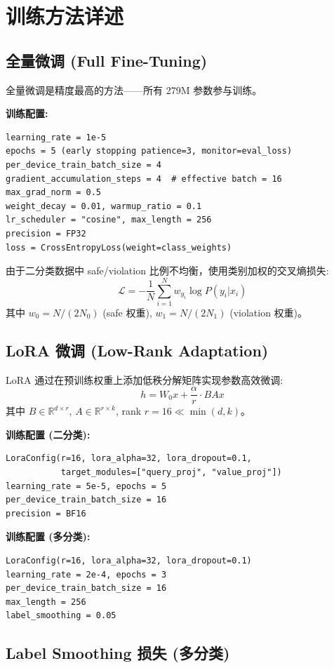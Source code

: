 \documentclass[11pt,a4paper]{article}
\begin{document}
\section{训练方法详述}

\subsection{全量微调 (Full Fine-Tuning)}

全量微调是精度最高的方法——所有 279M 参数参与训练。

\textbf{训练配置:}
\begin{verbatim}
learning_rate = 1e-5
epochs = 5 (early stopping patience=3, monitor=eval_loss)
per_device_train_batch_size = 4
gradient_accumulation_steps = 4  # effective batch = 16
max_grad_norm = 0.5
weight_decay = 0.01, warmup_ratio = 0.1
lr_scheduler = "cosine", max_length = 256
precision = FP32
loss = CrossEntropyLoss(weight=class_weights)
\end{verbatim}

由于二分类数据中 safe/violation 比例不均衡，使用类别加权的交叉熵损失:
\[ \mathcal{L} = -\frac{1}{N}\sum_{i=1}^N w_{y_i} \log P(y_i|x_i) \]
其中 $w_0 = N/(2N_0)$ (safe 权重), $w_1 = N/(2N_1)$ (violation 权重)。

\subsection{LoRA 微调 (Low-Rank Adaptation)}

LoRA 通过在预训练权重上添加低秩分解矩阵实现参数高效微调:
\[ h = W_0 x + \frac{\alpha}{r} \cdot BA x \]
其中 $B \in \mathbb{R}^{d \times r}$, $A \in \mathbb{R}^{r \times k}$, rank $r=16 \ll \min(d,k)$。

\textbf{训练配置 (二分类):}
\begin{verbatim}
LoraConfig(r=16, lora_alpha=32, lora_dropout=0.1,
           target_modules=["query_proj", "value_proj"])
learning_rate = 5e-5, epochs = 5
per_device_train_batch_size = 16
precision = BF16
\end{verbatim}

\textbf{训练配置 (多分类):}
\begin{verbatim}
LoraConfig(r=16, lora_alpha=32, lora_dropout=0.1)
learning_rate = 2e-4, epochs = 3
per_device_train_batch_size = 16
max_length = 256
label_smoothing = 0.05
\end{verbatim}

\subsection{Label Smoothing 损失 (多分类)}
\end{document}
